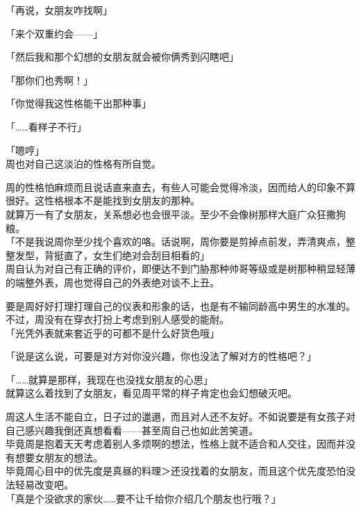「再说，女朋友咋找啊」

「来个双重约会——」

「然后我和那个幻想的女朋友就会被你俩秀到闪瞎吧」

「那你们也秀啊！」

「你觉得我这性格能干出那种事」

「……看样子不行」

「嗯哼」\\

周也对自己这淡泊的性格有所自觉。

周的性格怕麻烦而且说话直来直去，有些人可能会觉得冷淡，因而给人的印象不算很好。这性格根本不是能找到女朋友的那种。\\

就算万一有了女朋友，关系想必也会很平淡。至少不会像树那样大庭广众狂撒狗粮。\\

「不是我说周你至少找个喜欢的咯。话说啊，周你要是剪掉点前发，弄清爽点，整整发型，背挺直了，女生们绝对会刮目相看的」\\

周自认为对自己有正确的评价，即便达不到门胁那种帅哥等级或是树那种稍显轻薄的端整外表，周也觉得自己的外表绝对谈不上丑。

要是周好好打理打理自己的仪表和形象的话，也是有不输同龄高中男生的水准的。\\

不过，周没有在穿衣打扮上考虑到别人感受的能耐。\\

「光凭外表就来套近乎的可都不是什么好货色哦」

「说是这么说，可要是对方对你没兴趣，你也没法了解对方的性格吧？」

「……就算是那样，我现在也没找女朋友的心思」\\

就算这么着找到了女朋友，看见周平常的样子肯定也会幻想破灭吧。

周这人生活不能自立，日子过的邋遢，而且对人还不友好。不如说要是有女孩子对自己感兴趣我倒还真想看看——甚至周自己也如此苦笑道。\\

毕竟周是抱着天天考虑着别人多烦啊的想法，性格上就不适合和人交往，因而并没有想要女朋友的想法。\\

毕竟周心目中的优先度是真昼的料理＞还没找着的女朋友，而且这个优先度恐怕没法轻易改变吧。\\

「真是个没欲求的家伙……要不让千给你介绍几个朋友也行哦？」

